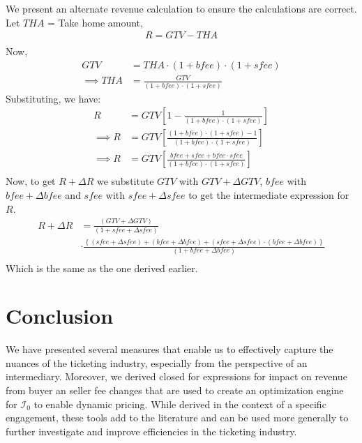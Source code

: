 \documentclass[letterpaper, 12pt]{article}
\begin{document}
\noindent We present an alternate revenue calculation to ensure the calculations are correct. Let $THA$ = Take home amount,
\begin{align*}
	R=GTV-THA\\
\end{align*}
Now, 
\begin{align*}
	GTV & =THA\cdot(1+bfee)\cdot(1+sfee)\\
	\implies THA & = \frac{GTV}{(1+bfee)\cdot(1+sfee)}
\end{align*}
Substituting, we have:
\begin{align*}
	R & = GTV \left[ 1 - \frac{1}{ (1+bfee)\cdot(1+sfee)}\right]\\
	\implies R &= GTV \left[ \frac{(1+bfee)\cdot(1+sfee) - 1}{(1+bfee)\cdot(1+sfee)} \right]\\
	\implies R &= GTV \left[ \frac{bfee + sfee + bfee\cdot sfee}{(1+bfee)\cdot(1+sfee)} \right]\\
\end{align*}
Now, to get $R+\Delta R$ we substitute $GTV$ with $GTV + \Delta GTV$, $bfee$ with $bfee + \Delta bfee$ and $sfee$ with $sfee + \Delta sfee$ to get the intermediate expression for $R$.
\begin{align*}
R+\Delta R &=\frac{ (GTV+\Delta GTV)}{(1+sfee+\Delta sfee)}\\
&\cdot\frac{\left\{ (sfee+\Delta sfee) + (bfee+\Delta bfee) + (sfee+\Delta sfee)\cdot(bfee+\Delta bfee)\right\}}{(1+bfee+\Delta bfee)}\\
\end{align*}
Which is the same as the one derived earlier.

\section{Conclusion}
We have presented several measures that enable us to effectively capture the nuances of the ticketing industry, especially from the perspective of an intermediary. Moreover, we derived closed for expressions for impact on revenue from buyer an seller fee changes that are used to create an optimization engine for $\mathcal{I}_0$ to enable dynamic pricing. While derived in the context of a specific engagement, these tools add to the literature and can be used more generally to further investigate and improve efficiencies in the ticketing industry.



\end{document}
